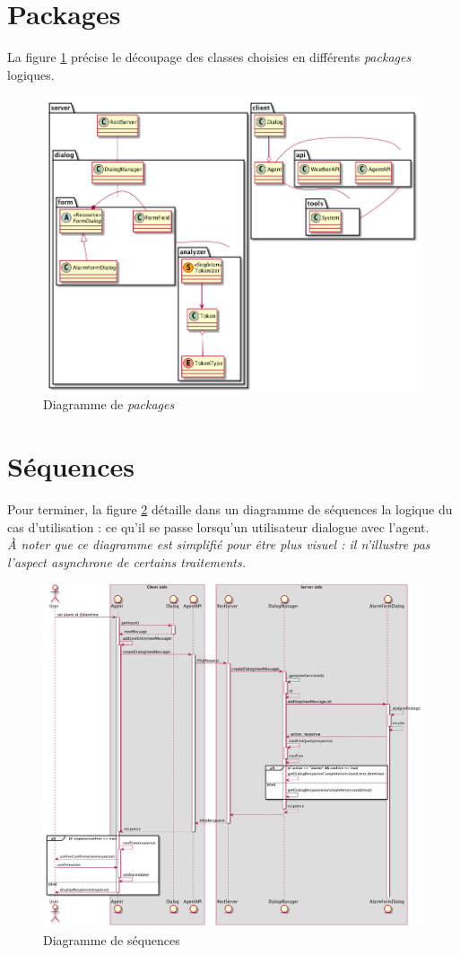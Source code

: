 \section{Packages}

La figure \ref{package-diagram} précise le découpage des classes choisies en différents \emph{packages} logiques.

\begin{figure}[!h]
    \centering
    \includegraphics[width=1.1\textwidth,center]{../docs/conception/build/packageDiagram.png}
    \caption{Diagramme de \emph{packages}}
    \label{package-diagram}
\end{figure}


\section{Séquences}

Pour terminer, la figure \ref{sequence-diagram} détaille dans un diagramme de séquences la logique du cas d'utilisation :
ce qu'il se passe lorsqu'un utilisateur dialogue avec l'agent.\\
\textit{À noter que ce diagramme est simplifié pour être plus
visuel : il n'illustre pas l'aspect asynchrone de certains traitements.}


\begin{figure}[!h]
    \centering
    \includegraphics[width=1.3\textwidth,center]{../docs/conception/build/sequenceDiagram.png}
    \caption{Diagramme de séquences}
    \label{sequence-diagram}
\end{figure}
